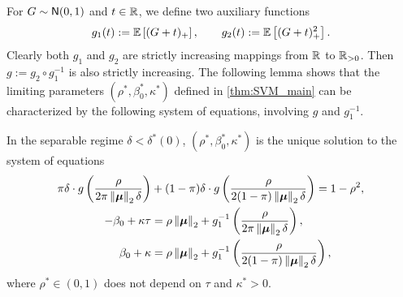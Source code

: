 For $G \sim {\sf N}(0, 1)$ and $t \in \mathbb{R}$, we define two auxiliary functions
\begin{equation}
\label{eq:fun_g1_g2}
	g_1 (t) := \mathbb{E} \left[ (G + t)_+ \right], \qquad g_2 (t) := \mathbb{E} \left[ (G + t)_+^2 \right].
\end{equation}
Clearly both $g_1$ and $g_2$ are strictly increasing mappings from $\mathbb{R}$ to $\mathbb{R}_{>0}$. Then $g := g_2 \circ g_1^{-1}$ is also strictly increasing. The following lemma shows that the limiting parameters $(\rho^*, \beta_0^*, \kappa^*)$ defined in \cref{thm:SVM_main} can be characterized by the following system of equations, involving $g$ and $g_1^{-1}$.



\begin{lem}
    \label{lem:gordon_eq}
    In the separable regime $\delta < \delta^*(0)$, $(\rho^*, \beta_0^*, \kappa^*)$ is the unique solution to the system of equations
    \begin{subequations}
    \begin{align}
    \label{eq:SVM_sys_eq_rho}
        \pi \delta \cdot g \left( \frac{\rho}{2 \pi \left\|{\text{\boldmath $\mu$}}\right\|_2 \delta} \right) & + (1 - \pi) \delta \cdot g \left( \frac{\rho}{2(1 - \pi) \left\|{\text{\boldmath $\mu$}}\right\|_2 \delta} \right) = 1 - \rho^2, \\
    \label{eq:SVM_sys_eq_bk1}
    - \beta_0 + \kappa \tau & = \rho \left\|{\text{\boldmath $\mu$}}\right\|_2 + g_1^{-1} \left( \frac{\rho}{2 \pi \left\|{\text{\boldmath $\mu$}}\right\|_2 \delta} \right), \\
    \label{eq:SVM_sys_eq_bk2}
	\beta_0 + \kappa & = \rho \left\|{\text{\boldmath $\mu$}}\right\|_2 + g_1^{-1} \left( \frac{\rho}{2 (1 - \pi) \left\|{\text{\boldmath $\mu$}}\right\|_2 \delta} \right),
    \end{align}
    \end{subequations}
    where $\rho^* \in (0, 1)$ does not depend on $\tau$ and $\kappa^* > 0$.
\end{lem}
